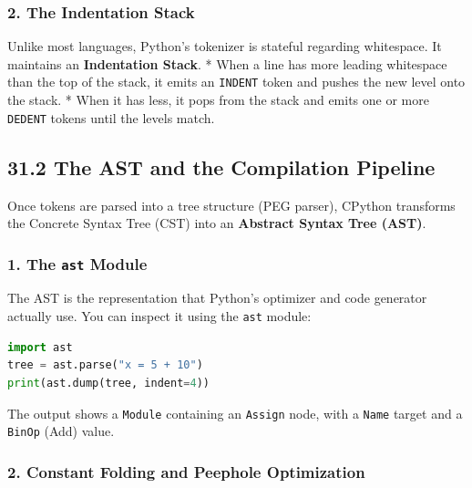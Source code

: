 \hypertarget{the-indentation-stack}{%
\subsubsection{2. The Indentation Stack}\label{the-indentation-stack}}

Unlike most languages, Python's tokenizer is stateful regarding
whitespace. It maintains an \textbf{Indentation Stack}. * When a line
has more leading whitespace than the top of the stack, it emits an
\passthrough{\lstinline!INDENT!} token and pushes the new level onto the
stack. * When it has less, it pops from the stack and emits one or more
\passthrough{\lstinline!DEDENT!} tokens until the levels match.

\hypertarget{the-ast-and-the-compilation-pipeline}{%
\subsection{31.2 The AST and the Compilation
Pipeline}\label{the-ast-and-the-compilation-pipeline}}

Once tokens are parsed into a tree structure (PEG parser), CPython
transforms the Concrete Syntax Tree (CST) into an \textbf{Abstract
Syntax Tree (AST)}.

\hypertarget{the-ast-module}{%
\subsubsection{\texorpdfstring{1. The \texttt{ast}
Module}{1. The ast Module}}\label{the-ast-module}}

The AST is the representation that Python's optimizer and code generator
actually use. You can inspect it using the \passthrough{\lstinline!ast!}
module:

\begin{lstlisting}[language=Python]
import ast
tree = ast.parse("x = 5 + 10")
print(ast.dump(tree, indent=4))
\end{lstlisting}

The output shows a \passthrough{\lstinline!Module!} containing an
\passthrough{\lstinline!Assign!} node, with a
\passthrough{\lstinline!Name!} target and a
\passthrough{\lstinline!BinOp!} (Add) value.

\hypertarget{constant-folding-and-peephole-optimization}{%
\subsubsection{2. Constant Folding and Peephole
Optimization}\label{constant-folding-and-peephole-optimization}}

